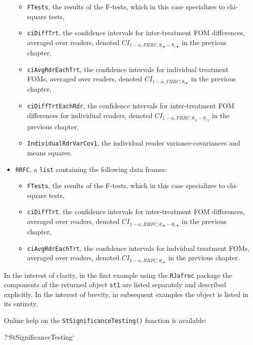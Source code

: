\documentclass[
]{book}
\newenvironment{Shaded}{\begin{snugshade}}{\end{snugshade}}
\newcommand{\DataTypeTok}[1]{\textcolor[rgb]{0.13,0.29,0.53}{#1}}
\newcommand{\NormalTok}[1]{#1}
\newcommand{\StringTok}[1]{\textcolor[rgb]{0.31,0.60,0.02}{#1}}
\providecommand{\tightlist}{%
  \setlength{\itemsep}{0pt}\setlength{\parskip}{0pt}}
\begin{document}
\begin{itemize}
  \begin{itemize}
  \tightlist
  \item
    \texttt{FTests}, the results of the F-tests, which in this case specializes to chi-square tests,
  \item
    \texttt{ciDiffTrt}, the confidence intervals for inter-treatment FOM differences, averaged over readers, denoted \(CI_{1-\alpha,FRRC,\theta_{i \bullet} - \theta_{i' \bullet}}\) in the previous chapter,
  \item
    \texttt{ciAvgRdrEachTrt}, the confidence intervals for individual treatment FOMs, averaged over readers, denoted \(CI_{1-\alpha,FRRC,\theta_{i \bullet}}\) in the previous chapter,
  \item
    \texttt{ciDiffTrtEachRdr}, the confidence intervals for inter-treatment FOM differences for individual readers, denoted \(CI_{1-\alpha,FRRC,\theta_{ij} - \theta_{i'j}}\) in the previous chapter,
  \item
    \texttt{IndividualRdrVarCov1}, the individual reader variance-covariances and means squares.
  \end{itemize}
\item
  \texttt{RRFC}, a \texttt{list} containing the following data frames:

  \begin{itemize}
  \tightlist
  \item
    \texttt{FTests}, the results of the F-tests, which in this case specializes to chi-square tests,
  \item
    \texttt{ciDiffTrt}, the confidence intervals for inter-treatment FOM differences, averaged over readers, denoted \(CI_{1-\alpha,RRFC,\theta_{i \bullet} - \theta_{i' \bullet}}\) in the previous chapter,
  \item
    \texttt{ciAvgRdrEachTrt}, the confidence intervals for indvidual treatment FOMs, averaged over readers, denoted \(CI_{1-\alpha,RRFC,\theta_{i \bullet}}\) in the previous chapter.
  \end{itemize}
\end{itemize}

In the interest of clarity, in the first example using the \texttt{RJafroc} package the components of the returned object \texttt{st1} are listed separately and described explicitly. In the interest of brevity, in subsequent examples the object is listed in its entirety.

Online help on the \texttt{StSignificanceTesting()} function is available:

\begin{Shaded}
\begin{Highlighting}[]
\NormalTok{?}\StringTok{`}\DataTypeTok{StSignificanceTesting}\StringTok{`}
\end{Highlighting}
\end{Shaded}
\end{document}
